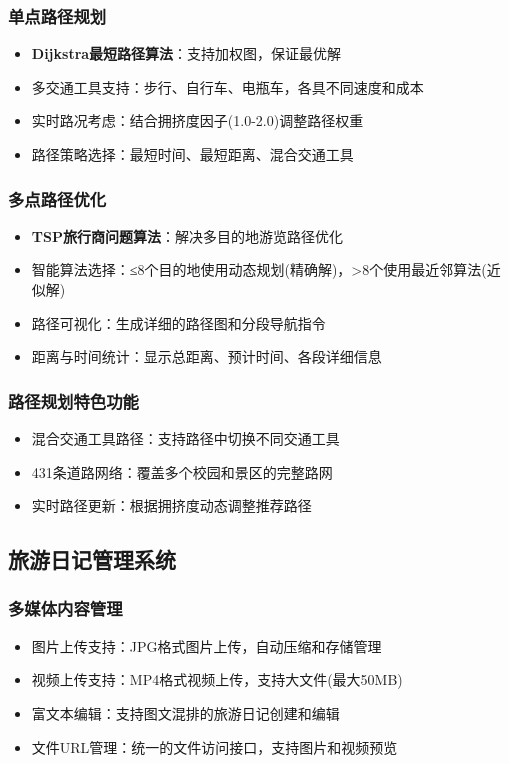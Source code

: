 \documentclass[12pt,a4paper]{article}
\begin{document}
\subsubsection{单点路径规划}
\begin{itemize}
    \item \textbf{Dijkstra最短路径算法}：支持加权图，保证最优解
    \item 多交通工具支持：步行、自行车、电瓶车，各具不同速度和成本
    \item 实时路况考虑：结合拥挤度因子(1.0-2.0)调整路径权重
    \item 路径策略选择：最短时间、最短距离、混合交通工具
\end{itemize}

\subsubsection{多点路径优化}
\begin{itemize}
    \item \textbf{TSP旅行商问题算法}：解决多目的地游览路径优化
    \item 智能算法选择：≤8个目的地使用动态规划(精确解)，>8个使用最近邻算法(近似解)
    \item 路径可视化：生成详细的路径图和分段导航指令
    \item 距离与时间统计：显示总距离、预计时间、各段详细信息
\end{itemize}

\subsubsection{路径规划特色功能}
\begin{itemize}
    \item 混合交通工具路径：支持路径中切换不同交通工具
    \item 431条道路网络：覆盖多个校园和景区的完整路网
    \item 实时路径更新：根据拥挤度动态调整推荐路径
\end{itemize}

\subsection{旅游日记管理系统}
\subsubsection{多媒体内容管理}
\begin{itemize}
    \item 图片上传支持：JPG格式图片上传，自动压缩和存储管理
    \item 视频上传支持：MP4格式视频上传，支持大文件(最大50MB)
    \item 富文本编辑：支持图文混排的旅游日记创建和编辑
    \item 文件URL管理：统一的文件访问接口，支持图片和视频预览
\end{itemize}
\end{document}
